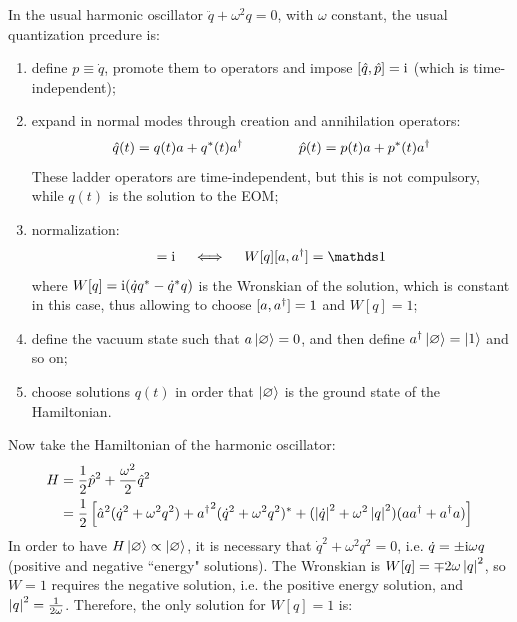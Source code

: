 In the usual harmonic oscillator $ \ddot{q} + \omega^2 q = 0 $, with $ \omega $ constant, the usual quantization prcedure is:
\begin{enumerate}
  \item define $ p \equiv \dot{q} $, promote them to operators and impose $ [\hat{q} , \hat{p}] = \mathrm{i} $ (which is time-independent);
  \item expand in normal modes through creation and annihilation operators:
    \begin{equation*}
      \hat{q}(t) = q(t) a + q^*(t) a^\dagger
      \qquad \qquad
      \hat{p}(t) = p(t) a + p^*(t) a^\dagger
    \end{equation*}
    These ladder operators are time-independent, but this is not compulsory, while $ q(t) $ is the solution to the EOM;
  \item normalization:
    \begin{equation*}
      [\hat{q} , \hat{p}] = \img
      \quad \iff \quad
      W[q][a , a\dg] = \id
    \end{equation*}
    where $ W[q] = \mathrm{i} (\dot{q} q^* - \dot{q}^* q) $ is the Wronskian of the solution, which is constant in this case, thus allowing to choose $ [a , a^\dagger] = 1 $ and $ W[q] = 1 $;
  \item define the vacuum state such that $ a \ket{\varnothing} = 0 $, and then define $ a^\dagger \ket{\varnothing} = \ket{1} $ and so on;
  \item choose solutions $ q(t) $ in order that $ \ket{\varnothing} $ is the ground state of the Hamiltonian.
\end{enumerate}
Now take the Hamiltonian of the harmonic oscillator:
\begin{equation*}
  \begin{split}
    H
    & = \frac{1}{2} \hat{p}^2 + \frac{\omega^2}{2} \hat{q}^2 \\
    & = \frac{1}{2} \left[ \hat{a}^2 (\dot{q}^2 + \omega^2 q^2) + {a^\dagger}^2 (\dot{q}^2 + \omega^2 q^2)^* + (\left\lvert\dot{q}\right\rvert^2 + \omega^2 \left\lvert q\right\rvert^2) (aa^\dagger + a^\dagger a) \right]
  \end{split}
\end{equation*}
In order to have $ H \ket{\varnothing} \propto \ket{\varnothing} $, it is necessary that $ \dot{q}^2 + \omega^2 q^2 = 0 $, i.e. $ \dot{q} = \pm \mathrm{i} \omega q $ (positive and negative ``energy" solutions). The Wronskian is $ W[q] = \mp 2 \omega \left\lvert q\right\rvert^2 $, so $ W = 1 $ requires the negative solution, i.e. the positive energy solution, and $ \left\lvert q\right\rvert^2 = \frac{1}{2\omega} $. Therefore, the only solution for $ W[q] = 1 $ is:
